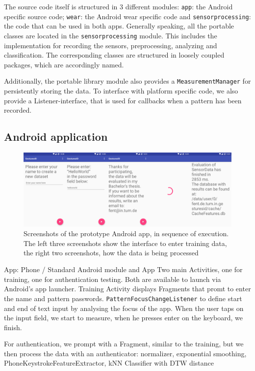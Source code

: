 The source code itself is structured in 3 different modules: \lstinline$app$: the Android specific source code; \lstinline$wear$: the Android wear specific code and \lstinline$sensorprocessing$: the code that can be used in both apps. Generally speaking, all the portable classes are located in the \lstinline$sensorprocessing$ module. This includes the implementation for recording the sensors, preprocessing, analyzing and classification. The corresponding classes are structured in loosely coupled \glspl{package}, which are accordingly named.

Additionally, the portable library module also provides a \lstinline$MeasurementManager$ for persistently storing the data. To interface with platform specific code, we also provide a Listener-interface, that is used for callbacks when a pattern has been recorded.

\subsection{Android application}
\begin{figure}
    \centering
    \includegraphics[width=\textwidth]{figures/MeasurementPhone.png}
    \caption{Screenshots of the prototype Android \gls{app}, in sequence of execution. The left three screenshots show the interface to enter training data, the right two screenshots, how the data is being processed}
    \label{fig:phonescreenshot}
\end{figure}

App: Phone / Standard Android module and App
Two main Activities, one for training, one for authentication testing. Both are available to launch via Android's app launcher.
Training Activity displays Fragments that promt to enter the name and pattern passwords. \lstinline$PatternFocusChangeListener$ to define start and end of text input by analysing the focus of the app. When the user taps on the input field, we start to measure, when he presses enter on the keyboard, we finish.

For authentication, we prompt with a Fragment, similar to the training, but we then process the data with an authenticator: normalizer, exponential smoothing, PhoneKeystrokeFeatureExtractor, kNN Classifier with DTW distance

